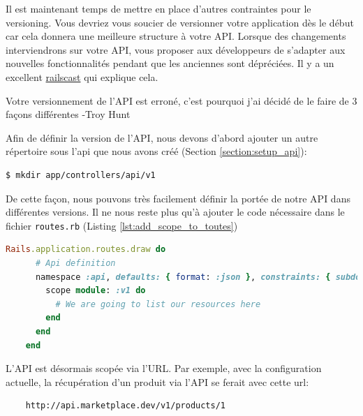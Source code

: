\documentclass[]{report}
\begin{document}
    Il est maintenant temps de mettre en place d'autres contraintes pour le versioning. Vous devriez vous soucier de versionner votre application dès le début car cela donnera une meilleure structure à votre API. Lorsque des changements interviendrons sur votre API, vous proposer aux développeurs de s'adapter aux nouvelles fonctionnalités pendant que les anciennes sont dépréciées. Il y a un excellent \href{http://railscasts.com/episodes/350-rest-api-versioning}{railscast} qui explique cela.


    Votre versionnement de l'API est erroné, c'est pourquoi j'ai décidé de le faire de 3 façons différentes -Troy Hunt

    Afin de définir la version de l'API, nous devons d'abord ajouter un autre répertoire sous l'api que nous avons créé (Section \ref{section:setup_api}):

    \begin{scriptsize}
    \begin{lstlisting}[language=bash]
    $ mkdir app/controllers/api/v1
    \end{lstlisting}
    \end{scriptsize}

    De cette façon, nous pouvons très facilement définir la portée de notre API dans différentes versions. Il ne nous reste plus qu'à ajouter le code nécessaire dans le fichier \verb|routes.rb| (Listing \ref{lst:add_scope_to_toutes})

    \begin{scriptsize}
    \begin{lstlisting}[language=ruby, caption={Spécification de la version de l'API}, label={lst:add_scope_to_toutes}]
    Rails.application.routes.draw do
      # Api definition
      namespace :api, defaults: { format: :json }, constraints: { subdomain: 'api' }, path: '/'  do
        scope module: :v1 do
          # We are going to list our resources here
        end
      end
    end
    \end{lstlisting}
    \end{scriptsize}

    L'API est désormais scopée via l'URL. Par exemple, avec la configuration actuelle, la récupération d'un produit via l'API se ferait avec cette url:

    \begin{scriptsize}
    \begin{lstlisting}
    http://api.marketplace.dev/v1/products/1
    \end{lstlisting}
    \end{scriptsize}
\end{document}
